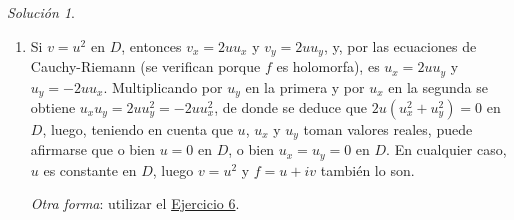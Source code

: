\documentclass[11pt]{report}
\theoremstyle{remark}
\newtheorem*{resolution}{Solución}
\begin{document}
\begin{resolution}
\hfill
\begin{enumerate}
    \item Si $v = u^2$ en $D$, entonces $v_x = 2uu_x$ y $v_y = 2uu_y$, y, por las ecuaciones de Cauchy-Riemann (se verifican porque $f$ es holomorfa), es $u_x = 2uu_y$ y $u_y = -2uu_x$. Multiplicando por $u_y$ en la primera y por $u_x$ en la segunda se obtiene $u_xu_y = 2uu_y^2 = -2uu_x^2$, de donde se deduce que $2u(u_x^2+u_y^2) = 0$ en $D$, luego, teniendo en cuenta que $u$, $u_x$ y $u_y$ toman valores reales, puede afirmarse que o bien $u = 0$ en $D$, o bien $u_x=u_y = 0$ en $D$. En cualquier caso, $u$ es constante en $D$, luego $v = u^2$ y $f=u+iv$ también lo son.

    \textit{Otra forma}: utilizar el \hyperref[ex6]{\color{blue}Ejercicio 6}.


\end{enumerate}
\end{resolution}
\end{document}
